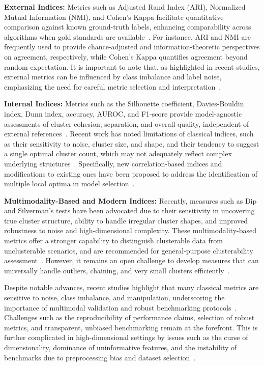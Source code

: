 \documentclass[sigconf]{acmart}
\begin{document}
\textbf{External Indices:} Metrics such as Adjusted Rand Index (ARI), Normalized Mutual Information (NMI), and Cohen’s Kappa facilitate quantitative comparison against known ground-truth labels, enhancing comparability across algorithms when gold standards are available~\cite{ref14,ref17,ref19,ref20,ref21,ref22,ref33,ref44,ref45,ref46,ref67,ref71,ref72,ref74,ref75,ref77,ref78,ref90,ref92,ref93,ref94,ref95,ref96,ref97,ref113}. For instance, ARI and NMI are frequently used to provide chance-adjusted and information-theoretic perspectives on agreement, respectively, while Cohen's Kappa quantifies agreement beyond random expectation. It is important to note that, as highlighted in recent studies, external metrics can be influenced by class imbalance and label noise, emphasizing the need for careful metric selection and interpretation~\cite{ref14,ref71,ref74}.

\textbf{Internal Indices:} Metrics such as the Silhouette coefficient, Davies-Bouldin index, Dunn index, accuracy, AUROC, and F1-score provide model-agnostic assessments of cluster cohesion, separation, and overall quality, independent of external references~\cite{ref14,ref16,ref17,ref19,ref21,ref33,ref44,ref46,ref50,ref59,ref60,ref67,ref71,ref72,ref75,ref77,ref78,ref90,ref92,ref93,ref94,ref95,ref96,ref97,ref100,ref113}. Recent work has noted limitations of classical indices, such as their sensitivity to noise, cluster size, and shape, and their tendency to suggest a single optimal cluster count, which may not adequately reflect complex underlying structures~\cite{ref59,ref60}. Specifically, new correlation-based indices and modifications to existing ones have been proposed to address the identification of multiple local optima in model selection~\cite{ref60}.

\textbf{Multimodality-Based and Modern Indices:} Recently, measures such as Dip and Silverman’s tests have been advocated due to their sensitivity in uncovering true cluster structure, ability to handle irregular cluster shapes, and improved robustness to noise and high-dimensional complexity. These multimodality-based metrics offer a stronger capability to distinguish clusterable data from unclusterable scenarios, and are recommended for general-purpose clusterability assessment~\cite{ref16,ref21,ref22,ref44,ref59,ref60,ref94}. However, it remains an open challenge to develop measures that can universally handle outliers, chaining, and very small clusters efficiently~\cite{ref59}.

Despite notable advances, recent studies highlight that many classical metrics are sensitive to noise, class imbalance, and manipulation, underscoring the importance of multimodal validation and robust benchmarking protocols~\cite{ref16,ref17,ref33,ref44,ref67,ref71,ref74,ref78,ref92,ref93,ref96,ref97}. Challenges such as the reproducibility of performance claims, selection of robust metrics, and transparent, unbiased benchmarking remain at the forefront. This is further complicated in high-dimensional settings by issues such as the curse of dimensionality, dominance of uninformative features, and the instability of benchmarks due to preprocessing bias and dataset selection~\cite{ref14,ref67,ref116}.
\end{document}
